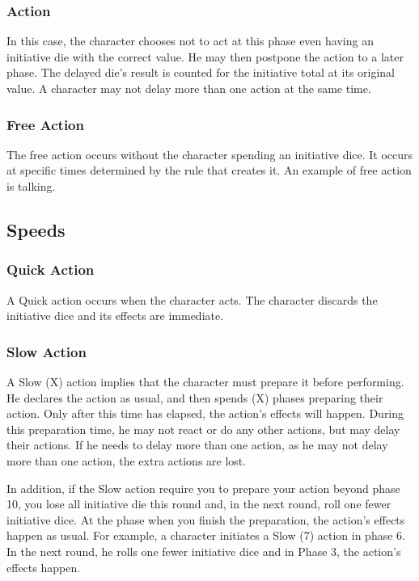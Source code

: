 \begin{multicols}{2}
\subsubsection{Action}
In this case, the character chooses not to
act at this phase even having an initiative die with
the correct value. He may then postpone the action
to a later phase. The delayed die’s result is counted
for the initiative total at its original value. A
character may not delay more than one action at
the same time.

\subsubsection{Free Action}
The free action occurs without the
character spending an initiative dice. It occurs at
specific times determined by the rule that creates
it. An example of free action is talking.

\subsection{Speeds}
\subsubsection{Quick Action}
A Quick action occurs when the character
acts. The character discards the initiative dice and
its effects are immediate.

\subsubsection{Slow Action}
A Slow (X) action implies that the
character must prepare it before performing. He
declares the action as usual, and then spends (X)
phases preparing their action. Only after this time
has elapsed, the action’s effects will happen.
During this preparation time, he may not react or
do any other actions, but may delay their actions.
If he needs to delay more than one action, as he
may not delay more than one action, the extra
actions are lost.

In addition, if the Slow action require you
to prepare your action beyond phase 10, you lose
all initiative die this round and, in the next round,
roll one fewer initiative dice. At the phase when
you finish the preparation, the action’s effects
happen as usual. For example, a character initiates
a Slow (7) action in phase 6. In the next round, he
rolls one fewer initiative dice and in Phase 3, the
action’s effects happen.


\end{multicols}
